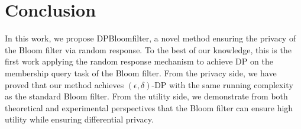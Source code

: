 \section{Conclusion}\label{sec:conclusion}

In this work, we propose DPBloomfilter, a novel method ensuring the privacy of the Bloom filter via random response. 
To the best of our knowledge, this is the first work applying the random response mechanism to achieve DP on the membership query task of the Bloom filter. 
From the privacy side, we have proved that our method achieves $(\epsilon, \delta)$-DP with the same running complexity as the standard Bloom filter. 
From the utility side, we demonstrate from both theoretical and experimental perspectives that the Bloom filter can ensure high utility while ensuring differential privacy.



